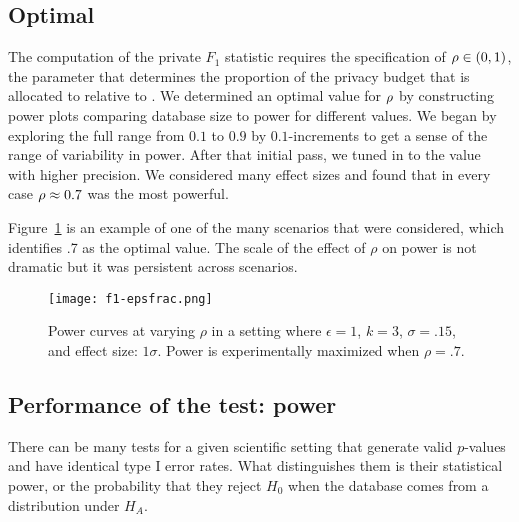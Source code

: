 \subsection{Optimal \epsfrac}\label{subsec:optrho}

The computation of the private $F_1$ statistic requires the specification of $\rho \in (0, 1)$, the parameter that determines the proportion of the privacy budget that is allocated to \sa relative to \se. We determined an optimal value for $\rho$ by constructing power plots comparing database size to power for different \epsfrac values. We began by exploring the full range from $0.1$ to $0.9$ by $0.1$-increments to get a sense of the range of variability in power. After that initial pass, we tuned in to the value with higher precision. We considered many effect sizes and found that in every case $\rho \approx 0.7$ was the most powerful.

Figure~\ref{Fig:f1-epsfrac} is an example of one of the many scenarios that were considered, which identifies .7 as the optimal value. The scale of the effect of $\rho$ on power is not dramatic but it was persistent across scenarios.


\begin{figure}
\centering
\texttt{[image: f1-epsfrac.png]}
\caption{Power curves at varying $\rho$ in a setting where $\epsilon = 1$, $k = 3$, $\sigma = .15$, and effect size: $1\sigma$. Power is experimentally maximized when $\rho = .7$.\label{Fig:f1-epsfrac}}
\end{figure}

\subsection{Performance of the test: power}
\label{subsec:power-analysis}

There can be many tests for a given scientific setting that generate valid $p$-values and have identical type I error rates. What distinguishes them is their statistical power, or the probability that they reject $H_0$ when the database comes from a distribution under $H_A$.

